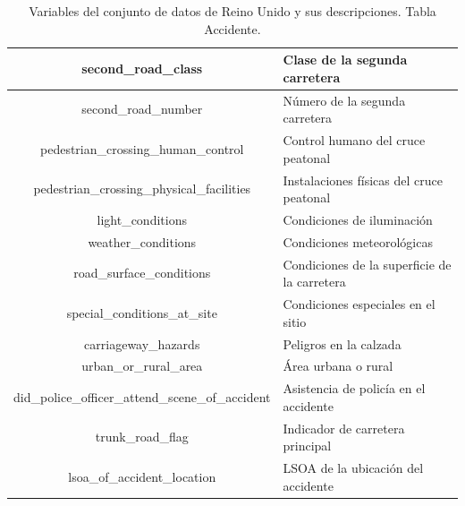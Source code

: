 \documentclass{uathesis-es}
\begin{document}
{\begin{table}[H]
\begin{center}
\begin{tabular}{|c|l|}
					second\_road\_class & Clase de la segunda carretera \\ \hline
					second\_road\_number & Número de la segunda carretera \\ \hline
					pedestrian\_crossing\_human\_control & Control humano del cruce peatonal \\ \hline
					pedestrian\_crossing\_physical\_facilities & Instalaciones físicas del cruce peatonal \\ \hline
					light\_conditions & Condiciones de iluminación \\ \hline
					weather\_conditions & Condiciones meteorológicas \\ \hline
					road\_surface\_conditions & Condiciones de la superficie de la carretera \\ \hline
					special\_conditions\_at\_site & Condiciones especiales en el sitio \\ \hline
					carriageway\_hazards & Peligros en la calzada \\ \hline
					urban\_or\_rural\_area & Área urbana o rural \\ \hline
					did\_police\_officer\_attend\_scene\_of\_accident & Asistencia de policía en el accidente \\ \hline
					trunk\_road\_flag & Indicador de carretera principal \\ \hline
					lsoa\_of\_accident\_location & LSOA de la ubicación del accidente \\ \hline
				\end{tabular}
			\end{center}
			\caption{Variables del conjunto de datos de Reino Unido y sus descripciones. Tabla Accidente.}
			\label{UK_ACCIDENT_TABLE}
		\end{table} 
		
}
\end{document}
